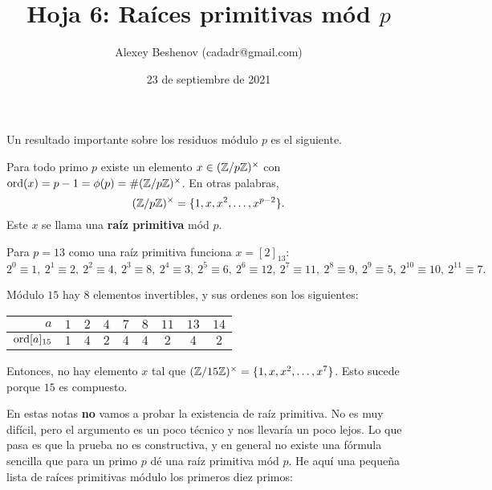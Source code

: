 \documentclass{article}
\title{Hoja 6: Raíces primitivas mód $p$}
\author{Alexey Beshenov (cadadr@gmail.com)}
\date{23 de septiembre de 2021}
\begin{document}
\maketitle

\setcounter{section}{6}

Un resultado importante sobre los residuos módulo $p$ es el siguiente.

\begin{framed}
  Para todo primo $p$ existe un elemento $x \in (\mathbb{Z}/p\mathbb{Z})^\times$ con
  $\operatorname{ord} (x) = p-1 = \phi(p) = \# (\mathbb{Z}/p\mathbb{Z})^\times$. En otras palabras,
  $$(\mathbb{Z}/p\mathbb{Z})^\times = \{ 1, x, x^2, \ldots, x^{p-2} \}.$$
  Este $x$ se llama una \textbf{raíz primitiva} mód $p$.
\end{framed}

\begin{ejemplo}
  Para $p = 13$ como una raíz primitiva funciona $x = [2]_{13}$:
  \[
    2^0 \equiv 1, ~
    2^1 \equiv 2, ~
    2^2 \equiv 4, ~
    2^3 \equiv 8, ~
    2^4 \equiv 3, ~
    2^5 \equiv 6, ~
    2^6 \equiv 12, ~
    2^7 \equiv 11, ~
    2^8 \equiv 9, ~
    2^9 \equiv 5, ~
    2^{10} \equiv 10, ~
    2^{11} \equiv 7.
  \]
\end{ejemplo}

\begin{ejemplo}
  Módulo $15$ hay $8$ elementos invertibles, y sus ordenes son los siguientes:
  \begin{center}
    \begin{tabular}{rcccccccc}
      \hline
      $a$ & $1$ & $2$ & $4$ & $7$ & $8$ & $11$ & $13$ & $14$ \\
      \hline
      $\operatorname{ord} [a]_{15}$ & $1$ & $4$ & $2$ & $4$ & $4$ & $2$ & $4$ & $2$ \\
      \hline
    \end{tabular}
  \end{center}
  Entonces, no hay elemento $x$ tal que
  $(\mathbb{Z}/15\mathbb{Z})^\times = \{ 1, x, x^2, \ldots, x^7 \}$.
  Esto sucede porque $15$ es compuesto.
\end{ejemplo}

En estas notas \textbf{no} vamos a probar la existencia de raíz primitiva.
No es muy difícil, pero el argumento es un poco técnico y nos llevaría un poco
lejos. Lo que pasa es que la prueba no es constructiva, y en general no existe
una fórmula sencilla que para un primo $p$ dé una raíz primitiva mód $p$.
He aquí una pequeña lista de raíces primitivas módulo los primeros diez primos:
\end{document}
